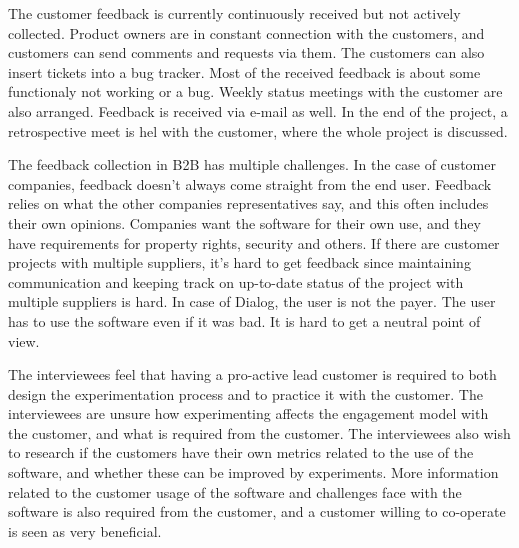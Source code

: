 \documentclass[english]{tktltiki2}
\theoremstyle{definition}
\theoremstyle{remark}
\begin{document}

The customer feedback is currently continuously received but not actively collected. Product owners are in constant connection with the customers, and customers can send comments and requests via them. The customers can also insert tickets into a bug tracker. Most of the received feedback is about some functionaly not working or a bug. Weekly status meetings with the customer are also arranged. Feedback is received via e-mail as well. In the end of the project, a retrospective meet is hel with the customer, where the whole project is discussed.  

The feedback collection in B2B has multiple challenges. In the case of customer companies, feedback doesn't always come straight from the end user. Feedback relies on what the other companies representatives say, and this often includes their own opinions. Companies want the software for their own use, and they have requirements for property rights, security and others. If there are customer projects with multiple suppliers, it's hard to get feedback since maintaining communication and keeping track on up-to-date status of the project with multiple suppliers is hard. In case of Dialog, the user is not the payer. The user has to use the software even if it was bad. It is hard to get a neutral point of view. 

The interviewees feel that having a pro-active lead customer is required to both design the experimentation process and to practice it with the customer. The interviewees are unsure how experimenting affects the engagement model with the customer, and what is required from the customer. The interviewees also wish to research if the customers have their own metrics related to the use of the software, and whether these can be improved by experiments. More information related to the customer usage of the software and challenges face with the software is also required from the customer, and a customer willing to co-operate is seen as very beneficial. 
\end{document}
